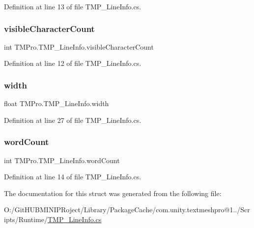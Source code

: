 Definition at line 13 of file T\+M\+P\+\_\+\+Line\+Info.\+cs.

\mbox{\label{struct_t_m_pro_1_1_t_m_p___line_info_a7b8f73404dad3ef77774d60757adc2ae}} 
\subsubsection{\texorpdfstring{visibleCharacterCount}{visibleCharacterCount}}
{\footnotesize\ttfamily int T\+M\+Pro.\+T\+M\+P\+\_\+\+Line\+Info.\+visible\+Character\+Count}



Definition at line 12 of file T\+M\+P\+\_\+\+Line\+Info.\+cs.

\mbox{\label{struct_t_m_pro_1_1_t_m_p___line_info_a83588bf25880d72d2f7296fdbe4788ad}} 
\subsubsection{\texorpdfstring{width}{width}}
{\footnotesize\ttfamily float T\+M\+Pro.\+T\+M\+P\+\_\+\+Line\+Info.\+width}



Definition at line 27 of file T\+M\+P\+\_\+\+Line\+Info.\+cs.

\mbox{\label{struct_t_m_pro_1_1_t_m_p___line_info_a5c5c82928595ce3573d26df72a19e041}} 
\subsubsection{\texorpdfstring{wordCount}{wordCount}}
{\footnotesize\ttfamily int T\+M\+Pro.\+T\+M\+P\+\_\+\+Line\+Info.\+word\+Count}



Definition at line 14 of file T\+M\+P\+\_\+\+Line\+Info.\+cs.



The documentation for this struct was generated from the following file\+:\begin{DoxyCompactItemize}
\item 
O\+:/\+Git\+H\+U\+B\+M\+I\+N\+I\+P\+Roject/\+Library/\+Package\+Cache/com.\+unity.\+textmeshpro@1../\+Scripts/\+Runtime/\mbox{\hyperlink{_t_m_p___line_info_8cs}{T\+M\+P\+\_\+\+Line\+Info.\+cs}}\end{DoxyCompactItemize}

